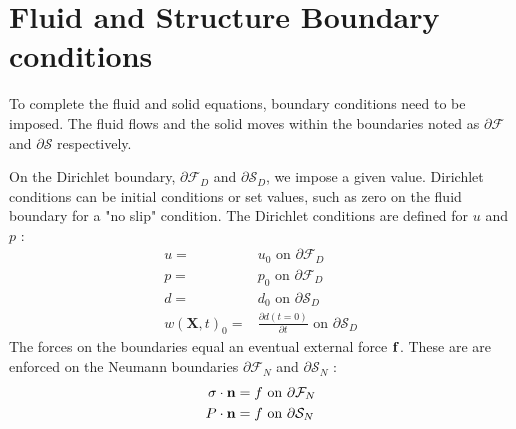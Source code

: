 \section{Fluid and Structure Boundary conditions}
To complete the fluid and solid equations, boundary conditions need to be imposed. The fluid flows and the solid moves within the boundaries noted as $ \partial\mathcal{F}$ and $ \partial \mathcal{S}$ respectively. 

On the Dirichlet boundary, $ \partial \mathcal{F}_D$ and $ \partial \mathcal{S}_D$, we impose a given value. Dirichlet conditions can be initial conditions or set values, such as zero on the fluid boundary for a "no slip" condition. The Dirichlet conditions are defined for $u$ and $p$ :
\begin{align}
u =& u_0 \text{   on   } \partial \mathcal{F}_D  \\
p =& p_0 \text{   on   } \partial \mathcal{F}_D  \\
d =& d_0 \text{ on   } \partial \mathcal{S}_D  \\
w(\textbf{X},t)_0 =& \frac{\partial d(t=0)}{\partial t} \text{   on   } \partial \mathcal{S}_D   
\end{align}
The forces on the boundaries equal an eventual external force $ \bold{f}$. These are are enforced on the Neumann boundaries $\partial \mathcal{F}_N$ and  $\partial \mathcal{S}_N$ :
\begin{align}
\sigma \cdot \bold{n} &= f \text{   on   } \partial \mathcal{F}_N \\   
P\cdot \bold{n} &= f \text{   on   } \partial \mathcal{S}_N    
\end{align}
